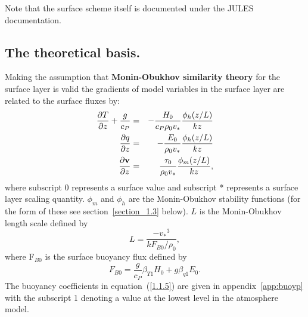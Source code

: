 \documentclass{UMDP_article}
\begin{document}
Note that the surface scheme itself is documented under the JULES
documentation.

\subsection{The theoretical basis.}\label{section_1}
Making the assumption that \textbf{Monin-Obukhov similarity theory}
for the surface layer is valid the gradients of model variables in the
surface layer are related to the surface fluxes by:
\begin{eqnarray}
  \frac{\partial T}{\partial z} + \frac{g}{ c_P }&=&-\frac{ H_0 }{ c_P  \rho _0  v_\ast } \frac{ \phi _h (z/L)}{kz}\label{1.1.1}\\
  \frac{\partial q}{\partial z}&=&-\frac{ E_0 }{ \rho _0  v_\ast } \frac{ \phi _h (z/L)}{kz}\label{1.1.2}\\ 
  \frac{\partial {\rm {\bf v}}}{\partial z}&=&\frac{ {\rm {\bf \tau }}_{0} }{ \rho _0  v_\ast } \frac{ \phi _m (z/L)}{kz},\label{1.1.3}
\end{eqnarray}
where subscript 0 represents a surface value and subscript *
represents a surface layer scaling quantity. $\phi _{m}$ and $\phi
_{h}$ are the Monin-Obukhov stability functions (for the form of these
see section~\ref{section_1.3} below).  $L$ is the Monin-Obukhov length
scale defined by
\begin{equation}
  L = \frac{-  { v_\ast }^3 }{k  F_{B0} / \rho _0 },
  \label{1.1.4}
\end{equation}
where F$_{B0}$ is the surface buoyancy flux defined by
\begin{equation}
  F_{B0} =  \frac{ g }{ c_P } \beta _{T1}  H_0  +  g \beta _{q1}  E_0.
  \label{1.1.5}
\end{equation}
The buoyancy coefficients in equation~(\ref{1.1.5}) are given in
appendix~\ref{app:buoyp} with the subscript 1 denoting a value at the
lowest level in the atmosphere model.
\end{document}
